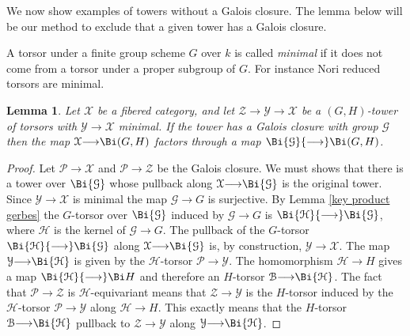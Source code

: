\documentclass[12pt,reqno]{amsart}
\theoremstyle{plain}
\newtheorem{lem}[thm]{Lemma}
\theoremstyle{definition}
\numberwithin{thm}{section}
\newcounter{x}\setcounter{x}{1}
\theoremstyle{plain}
\begin{document}
We now show examples of towers without a Galois closure. The lemma below will be our
method to exclude that a given tower has a Galois closure.

A torsor under a finite group scheme $G$ over $k$ is called \emph{minimal} if it does not come from a torsor under a proper subgroup of $G$. For instance Nori reduced torsors are minimal.

\begin{lem}\label{Galois closure and gerbes}
Let ${\mathcal{X}}$ be a fibered category, and let ${\mathcal{Z}}{\longrightarrow} {\mathcal{Y}}{\longrightarrow} {\mathcal{X}}$ be a
$(G,H)$-tower of torsors with ${\mathcal{Y}}{\longrightarrow} {\mathcal{X}}$ minimal. If the tower has a Galois closure
with group ${\mathcal{G}}$ then the map ${\mathcal{X}}{\longrightarrow} \Bi(G,H)$ factors through a map $\Bi {\mathcal{G}} {\longrightarrow} \Bi(G,H)$.
\end{lem}

\begin{proof}
Let ${\mathcal{P}}{\longrightarrow} {\mathcal{X}}$ and ${\mathcal{P}}{\longrightarrow} {\mathcal{Z}}$ be the Galois closure. We must shows that there is a tower
over $\Bi{\mathcal{G}}$ whose pullback along ${\mathcal{X}}{\longrightarrow} \Bi{\mathcal{G}}$ is the original tower. Since ${\mathcal{Y}}{\longrightarrow} {\mathcal{X}}$
is minimal the map ${\mathcal{G}}{\longrightarrow} G$ is surjective. By Lemma \ref{key product gerbes} the $G$-torsor over
$\Bi{\mathcal{G}}$ induced by ${\mathcal{G}}{\longrightarrow} G$ is $\Bi {\mathcal{H}} {\longrightarrow} \Bi{\mathcal{G}}$, where ${\mathcal{H}}$ is the kernel of
${\mathcal{G}}{\longrightarrow} G$. The pullback of the $G$-torsor $\Bi{\mathcal{H}}{\longrightarrow}\Bi{\mathcal{G}}$ along ${\mathcal{X}}{\longrightarrow} \Bi{\mathcal{G}}$ is, by
construction, ${\mathcal{Y}}{\longrightarrow} {\mathcal{X}}$. The map ${\mathcal{Y}}{\longrightarrow} \Bi {\mathcal{H}}$ is given by the ${\mathcal{H}}$-torsor
${\mathcal{P}}{\longrightarrow} {\mathcal{Y}}$. The homomorphism ${\mathcal{H}}{\longrightarrow} H$ gives a map $\Bi{\mathcal{H}} {\longrightarrow} \Bi H$ and therefore an $H$-torsor
${\mathcal{B}}{\longrightarrow} \Bi {\mathcal{H}}$. The fact that ${\mathcal{P}}{\longrightarrow} {\mathcal{Z}}$ is ${\mathcal{H}}$-equivariant means that
${\mathcal{Z}}{\longrightarrow} {\mathcal{Y}}$ is the $H$-torsor induced by the ${\mathcal{H}}$-torsor ${\mathcal{P}}{\longrightarrow} {\mathcal{Y}}$ along ${\mathcal{H}}{\longrightarrow} H$.
This exactly means that the $H$-torsor ${\mathcal{B}}{\longrightarrow} \Bi{\mathcal{H}}$ pullback to ${\mathcal{Z}}{\longrightarrow} {\mathcal{Y}}$ along
${\mathcal{Y}}{\longrightarrow} \Bi{\mathcal{H}}$.
 \end{proof}
 
\end{document}
